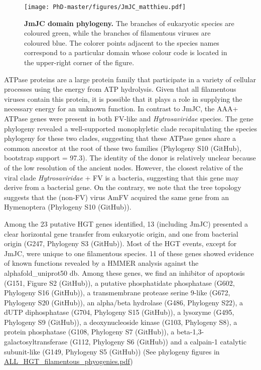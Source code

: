  \begin{figure}[H]
\texttt{[image: PhD-master/figures/JmJC\_matthieu.pdf]}\centering
\caption[Paper2:JmJC filamentous virus phylogeny]{\textbf{JmJC domain phylogeny.} The branches of eukaryotic species are coloured green, while the branches of filamentous viruses are coloured blue. The colorer points adjacent to the species names correspond to a particular domain whose colour code is located in the upper-right corner of the figure.}
\label{figure:JmJC_matthieu}
\end{figure}

ATPase proteins are a large protein family that participate in a variety of cellular processes using the energy from ATP hydrolysis. Given that all filamentous viruses contain this protein, it is possible that it plays a role in supplying the necessary energy for an unknown function. In contrast to JmJC, the AAA+ ATPase genes were present in both FV-like and \textit{Hytrosaviridae} species. The gene phylogeny revealed a well-supported monophyletic clade recapitulating the species phylogeny for these two clades, suggesting that these ATPase genes share a common ancestor at the root of these two families (Phylogeny S10 (GitHub), bootstrap support = 97.3). The identity of the donor is relatively unclear because of the low resolution of the ancient nodes. However, the closest relative of the viral clade \textit{Hytrosaviridae} + FV is a  bacteria, suggesting that this gene may derive from a bacterial gene. On the contrary, we note that the tree topology suggests that the (non-FV) virus AmFV acquired the same gene from an Hymenoptera (Phylogeny S10 (GitHub)).  

Among the 23 putative HGT genes identified, 13 (including JmJC) presented a clear horizontal gene transfer from eukaryotic origin, and one from bacterial origin (G247, Phylogeny S3 (GitHub)). Most of the HGT events, except for JmJC, were unique to one filamentous species. 11 of these genes showed evidence of known functions revealed by a HMMER analysis against the alphafold\_uniprot50 db. Among these genes, we find an inhibitor of apoptosis (G151, Figure S2 (GitHub)), a putative phosphatidate phosphatase (G602, Phylogeny S16 (GitHub)),  a transmembrane protease serine 9-like (G672, Phylogeny S20 (GitHub)), an alpha/beta hydrolase (G486, Phylogeny S22), a dUTP diphosphatase (G704, Phylogeny S15 (GitHub)), a lysozyme (G495, Phylogeny S9 (GitHub)),  a deoxynucleoside kinase (G103, Phylogeny S8), a protein phosphatase (G108, Phylogeny S7 (GitHub)), a beta-1,3-galactosyltransferase (G112, Phylogeny S6 (GitHub)) and a calpain-1 catalytic subunit-like (G149, Phylogeny S5 (GitHub)) (See phylogeny figures in \href{https://github.com/BenjaminGuinet/PhD_defense/blob/main/Supplementary_paper2/ALL_HGT_filamentous_phyogenies.pdf}{ALL\_HGT\_filamentous\_phyogenies.pdf})



